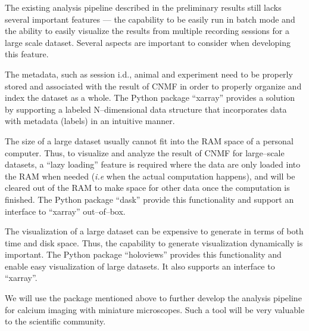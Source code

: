 \documentclass[master.tex]{subfiles}
\begin{document}
The existing analysis pipeline described in the preliminary results still lacks
several important features --- the capability to be easily run in batch mode and
the ability to easily visualize the results from multiple recording sessions for
a large scale dataset. Several aspects are important to consider when developing
this feature.
\begin{inparaenum}[a)]
\item The metadata, such as session i.d., animal and experiment need to be
  properly stored and associated with the result of CNMF in order to properly
  organize and index the dataset as a whole. The Python package ``xarray''
  provides a solution by supporting a labeled N--dimensional data structure that
  incorporates data with metadata (labels) in an intuitive manner.
\item The size of a large dataset usually cannot fit into the RAM space of a
  personal computer. Thus, to visualize and analyze the result of CNMF for
  large--scale datasets, a ``lazy loading'' feature is required where the data
  are only loaded into the RAM when needed (\textit{i.e} when the actual
  computation happens), and will be cleared out of the RAM to make space for
  other data once the computation is finished. The Python package ``dask''
  provide this functionality and support an interface to ``xarray''
  out--of--box.
\item The visualization of a large dataset can be expensive to generate in terms
  of both time and disk space. Thus, the capability to generate visualization
  dynamically is important. The Python package ``holoviews'' provides this
  functionality and enable easy visualization of large datasets. It also
  supports an interface to ``xarray''.
\end{inparaenum}
We will use the package mentioned above to further develop the analysis pipeline
for calcium imaging with miniature microscopes. Such a tool will be very
valuable to the scientific community.
\end{document}
